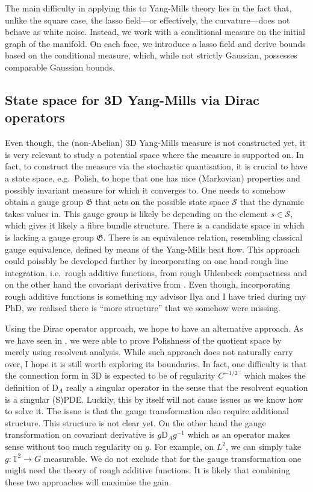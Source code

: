 \documentclass[12pt]{article}
\numberwithin{equation}{section}
\theoremstyle{definition}
\theoremstyle{remark}
\newcommand{\1}{\mathbf 1}
\newcommand{\<}{\langle}
\renewcommand{\>}{\rangle}
\newcommand{\cS}{\mathcal S}
\newcommand{\rmD}{\mathrm{D}}
\newcommand{\fG}{\mathfrak{G}}
\newcommand{\bT}{\mathbb T}
\begin{document}
The main difficulty in applying this to Yang-Mills theory lies in the fact that, unlike the square case, the lasso field—or effectively, the curvature—does not behave as white noise. Instead, we work with a conditional measure on the initial graph of the manifold. On each face, we introduce a lasso field and derive bounds based on the conditional measure, which, while not strictly Gaussian, possesses comparable Gaussian bounds.
%
\subsection{State space for 3D Yang-Mills via Dirac operators}
%
Even though, the (non-Abelian) 3D Yang-Mills measure is not constructed yet, it is very relevant to study a potential space where the measure is supported on. In fact, to construct the measure via the stochastic quantisation, it is crucial to have a state space, e.g.\ Polish, to hope that one has nice (Markovian) properties and possibly invariant measure for which it converges to. One needs to somehow obtain a gauge group $\fG$ that acts on the possible state space $\cS$ that the dynamic takes values in. This gauge group is likely be depending on the element $s\in\cS$, which gives it likely a fibre bundle structure. There is a candidate space in \cite{CCHS3d} which is lacking a gauge group $\fG$. There is an equivalence relation, resembling classical gauge equivalence, defined by means of the Yang-Mills heat flow. This approach could poissbly be developed further by incorporating on one hand rough line integration, i.e.\ rough additive functions, from rough Uhlenbeck compactness and on the other hand the covariant derivative from . Even though, incorporating rough additive functions is something my advisor Ilya and I have tried during my PhD, we realised there is ``more structure'' that we somehow were missing. 

Using the Dirac operator approach, we hope to have an alternative approach. As we have seen in , we were able to prove Polishness of the quotient space by merely using resolvent analysis. While such approach does not naturally carry over, I hope it is still worth exploring its boundaries. In fact, one difficulty is that the connection form in 3D is expected to be of regularity $C^{-1/2^-}$ which makes the definition of $\rmD_A$ really a singular operator in the sense that the resolvent equation is a singular (S)PDE. Luckily, this by itself will not cause issues as we know how to solve it. The issue is that the gauge transformation also require additional structure. This structure is not clear yet. On the other hand the gauge transformation on covariant derivative is $g\rmD_Ag^{-1}$ which as an operator makes sense without too much regularity on $g$. For example, on $L^2$, we can simply take $g:\bT^2\to G$ measurable. We do not exclude that for the gauge transformation one might need the theory of rough additive functions. It is likely that combining these two approaches will maximise the gain. 
\end{document}
